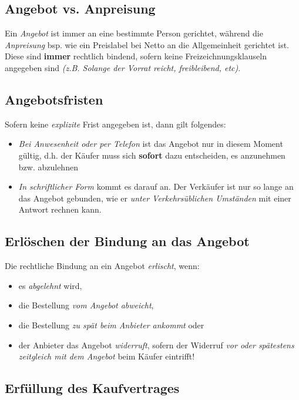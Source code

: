 \documentclass[a4paper, 12pt]{report}
\begin{document}
\begin{multicols}{2}
\subsection{Angebot vs. Anpreisung}

Ein \emph{Angebot} ist immer an eine bestimmte Person gerichtet, während die
\emph{Anpreisung} bsp. wie ein Preislabel bei Netto an die Allgemeinheit
gerichtet ist. Diese sind \textbf{immer} rechtlich bindend, sofern keine
Freizeichnungsklauseln angegeben sind \emph{(z.B. \glqq Solange der Vorrat
reicht\grqq{}, \glqq freibleibend\grqq{}, etc)}.

\subsection{Angebotsfristen}

Sofern keine \emph{explizite} Frist angegeben ist, dann gilt folgendes:

\begin{itemize}
    \item \emph{Bei Anwesenheit oder per Telefon} ist das Angebot nur in diesem
	Moment gültig, d.h. der Käufer muss sich \textbf{sofort} dazu
	entscheiden, es anzunehmen bzw. abzulehnen
    \item \emph{In schriftlicher Form} kommt es darauf an. Der Verkäufer ist nur
	so lange an das Angebot gebunden, wie er \emph{unter Verkehrsüblichen
	Umständen} mit einer Antwort rechnen kann.
\end{itemize}

\subsection{Erlöschen der Bindung an das Angebot}

Die rechtliche Bindung an ein Angebot \emph{erlischt}, wenn:

\begin{itemize}
    \item es \emph{abgelehnt} wird,
    \item die Bestellung \emph{vom Angebot abweicht},
    \item die Bestellung \emph{zu spät beim Anbieter ankommt} oder
    \item der Anbieter das Angebot \emph{widerruft}, sofern der Widerruf \emph{
	vor oder spätestens zeitgleich mit dem Angebot} beim Käufer
	eintrifft!
\end{itemize}

\subsection{Erfüllung des Kaufvertrages}


\end{multicols}
\end{document}
